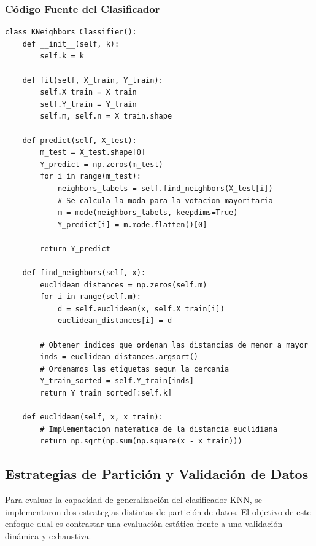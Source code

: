 \documentclass[12pt]{article}
\begin{document}
\subsubsection{Código Fuente del Clasificador}

\begin{minipage}{0.9\textwidth}
\begin{lstlisting}[caption={Implementación manual del clasificador KNN en Python}]
class KNeighbors_Classifier():
    def __init__(self, k):
        self.k = k
        
    def fit(self, X_train, Y_train):
        self.X_train = X_train
        self.Y_train = Y_train
        self.m, self.n = X_train.shape
        
    def predict(self, X_test):
        m_test = X_test.shape[0]
        Y_predict = np.zeros(m_test)
        for i in range(m_test):
            neighbors_labels = self.find_neighbors(X_test[i])
            # Se calcula la moda para la votacion mayoritaria
            m = mode(neighbors_labels, keepdims=True)
            Y_predict[i] = m.mode.flatten()[0]
        
        return Y_predict

    def find_neighbors(self, x):
        euclidean_distances = np.zeros(self.m)
        for i in range(self.m):
            d = self.euclidean(x, self.X_train[i])
            euclidean_distances[i] = d
        
        # Obtener indices que ordenan las distancias de menor a mayor
        inds = euclidean_distances.argsort()
        # Ordenamos las etiquetas segun la cercania
        Y_train_sorted = self.Y_train[inds]
        return Y_train_sorted[:self.k]

    def euclidean(self, x, x_train):
        # Implementacion matematica de la distancia euclidiana
        return np.sqrt(np.sum(np.square(x - x_train)))
\end{lstlisting}
\end{minipage}

\subsection{Estrategias de Partición y Validación de Datos}

Para evaluar la capacidad de generalización del clasificador KNN, se implementaron dos estrategias distintas de partición de datos. El objetivo de este enfoque dual es contrastar una evaluación estática frente a una validación dinámica y exhaustiva.
\end{document}
